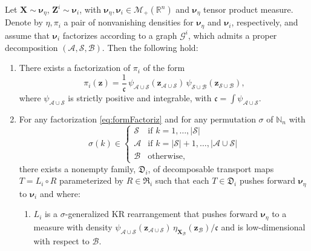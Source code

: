 \documentclass[twoside,11pt]{article}
\newcommand{\borelm}{\mathscr{M}}
\newcommand{\borelmp}{\borelm_+}
\newcommand{\genm}{\boldsymbol{\nu} }   %
\newcommand{\re}{\mathbb{R}}
\newcommand{\Bc}{\mathcal{B}}
\newcommand{\Ac}{\mathcal{A}}
\newcommand{\Sc}{\mathcal{S}}
\newcommand{\Xb}{\boldsymbol{X}}
\newcommand{\Zb}{\boldsymbol{Z}}
\newcommand{\zb}{\boldsymbol{z}}
\newcommand{\Gcb}{\boldsymbol{\mathcal{G}}}
\newcommand{\lmap}{L} %
\newcommand{\rmap}{R} %
\newcommand{\decset}{\mathfrak{D}} %
\newcommand{\Aset}{ \Ac }
\newcommand{\Bset}{ \Bc }
\newcommand{\Sset}{ \Sc }
\begin{document}
\begin{theorem} \label{thm:decompTrans}
Let $\Xb \sim \genm_\eta$, $\Zb^i \sim \genm_i$, with
$\genm_\eta,\genm_i \in \borelmp(\re^n)$ and
$\genm_\eta$ tensor product measure. %
Denote by $\eta,\pi_i$ a pair of nonvanishing densities for 
$\genm_\eta$ and $\genm_i$, respectively, and
assume that
$\genm_i$ factorizes according to a graph 
$\Gcb^i$, which admits a proper decomposition
$(\Aset,\Sset,\Bset)$.
%
%
%
%
%
%
%
%
%
Then the following hold:
%
\begin{enumerate}
  \item  
    \label{thm:decompTrans_partFactorizationPi}
    There exists a factorization of $\pi_i$ of the form
    \begin{equation} \label{eq:formFactoriz}
    \pi_i(\zb)= 
    \frac{1}{\mathfrak{c}} \,
    \psi_{\Aset \cup \Sset}(\zb_{\Aset \cup \Sset}) \, 
    \psi_{\Sset \cup \Bset }(\zb_{ \Sset \cup \Bset }),
    \end{equation}
    where 
    $\psi_{\Aset \cup \Sset}$ is strictly positive and integrable, 
    with $\mathfrak{c} = \int \psi_{ \Aset \cup \Sset}$.
  \smallskip
    
  \item 
  \label{thm:decompTrans_partT}
  For any factorization \eqref{eq:formFactoriz}  and for any permutation
    $\sigma$ of $\mathbb{N}_n$ with 
      \begin{equation} \label{eq:formPerm}
      \sigma(k)\in 
      \begin{cases} 
      \Sset &\mbox{if }  k = 1,\ldots,|\Sset|  \\ 
      \Aset & \mbox{if } k = |\Sset|+1,\ldots, |\Aset\cup \Sset| \\
      \Bset & \mbox{otherwise},
      \end{cases}
      \end{equation} 
  there exists a nonempty family, $\decset_i$,
  of decomposable transport maps $T = \lmap_i \circ \rmap$ parameterized
  by $\rmap \in \mathfrak{R}_i$ such that each $T\in \decset_i$
  pushes forward $\genm_\eta$ to $\genm_i$ and where: %
    \begin{enumerate}
      \item 
      \label{thm:decompTrans_partLeftMap}
      $\lmap_i$ is a $\sigma$-generalized KR rearrangement 
      that pushes forward $\genm_\eta$ to a measure with density
      $\psi_{\Aset \cup \Sset}(\zb_{\Aset \cup \Sset}) \, 
      \eta_{\Xb_{\Bset}}(\zb_{\Bset})/\mathfrak{c}$
      and
      is low-dimensional with respect to $\Bset$.


\end{enumerate}
\end{enumerate}
\end{theorem}
\end{document}
